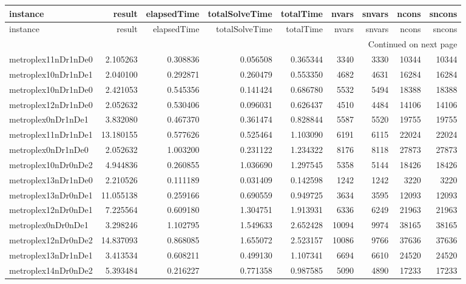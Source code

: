 \begin{longtable}{|l|r|r|r|r|r|r|r|r|}
\toprule
instance & result & elapsedTime & totalSolveTime & totalTime & nvars & snvars & ncons & sncons \\
\midrule
\endfirsthead
\toprule
instance & result & elapsedTime & totalSolveTime & totalTime & nvars & snvars & ncons & sncons \\
\midrule
\endhead
\midrule
\multicolumn{9}{r}{Continued on next page} \\
\midrule
\endfoot
\bottomrule
\endlastfoot
metroplex11nDr1nDe0 & 2.105263 & 0.308836 & 0.056508 & 0.365344 & 3340 & 3330 & 10344 & 10344 \\
metroplex10nDr1nDe1 & 2.040100 & 0.292871 & 0.260479 & 0.553350 & 4682 & 4631 & 16284 & 16284 \\
metroplex10nDr1nDe0 & 2.421053 & 0.545356 & 0.141424 & 0.686780 & 5532 & 5494 & 18388 & 18388 \\
metroplex12nDr1nDe0 & 2.052632 & 0.530406 & 0.096031 & 0.626437 & 4510 & 4484 & 14106 & 14106 \\
metroplex0nDr1nDe1 & 3.832080 & 0.467370 & 0.361474 & 0.828844 & 5587 & 5520 & 19755 & 19755 \\
metroplex11nDr1nDe1 & 13.180155 & 0.577626 & 0.525464 & 1.103090 & 6191 & 6115 & 22024 & 22024 \\
metroplex0nDr1nDe0 & 2.052632 & 1.003200 & 0.231122 & 1.234322 & 8176 & 8118 & 27873 & 27873 \\
metroplex10nDr0nDe2 & 4.944836 & 0.260855 & 1.036690 & 1.297545 & 5358 & 5144 & 18426 & 18426 \\
metroplex13nDr1nDe0 & 2.210526 & 0.111189 & 0.031409 & 0.142598 & 1242 & 1242 & 3220 & 3220 \\
metroplex13nDr0nDe1 & 11.055138 & 0.259166 & 0.690559 & 0.949725 & 3634 & 3595 & 12093 & 12093 \\
metroplex12nDr0nDe1 & 7.225564 & 0.609180 & 1.304751 & 1.913931 & 6336 & 6249 & 21963 & 21963 \\
metroplex0nDr0nDe1 & 3.298246 & 1.102795 & 1.549633 & 2.652428 & 10094 & 9974 & 38165 & 38165 \\
metroplex12nDr0nDe2 & 14.837093 & 0.868085 & 1.655072 & 2.523157 & 10086 & 9766 & 37636 & 37636 \\
metroplex13nDr1nDe1 & 3.413534 & 0.608211 & 0.499130 & 1.107341 & 6694 & 6610 & 24520 & 24520 \\
metroplex14nDr0nDe2 & 5.393484 & 0.216227 & 0.771358 & 0.987585 & 5090 & 4890 & 17233 & 17233 \\

\end{longtable}
